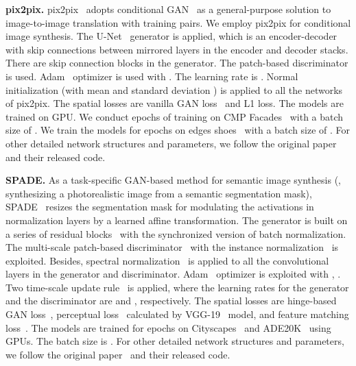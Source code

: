 \documentclass[10pt,twocolumn,letterpaper]{article}
\begin{document}
\vspace{0.1cm}
\noindent
\textbf{pix2pix.}
pix2pix~\cite{pix2pix} adopts conditional GAN~\cite{congan} as a general-purpose solution to image-to-image translation with training pairs.
We employ pix2pix for conditional image synthesis.
The U-Net~\cite{unet} generator is applied, which is an encoder-decoder with skip connections between mirrored layers in the encoder and decoder stacks. There are  skip connection blocks in the generator.
The patch-based discriminator is used.
Adam~\cite{adam} optimizer is used with . The learning rate is . Normal initialization (with mean  and standard deviation ) is applied to all the networks of pix2pix.
The spatial losses are vanilla GAN loss~\cite{GAN} and L1 loss.
The models are trained on  GPU.
We conduct  epochs of training on CMP Facades~\cite{cmpfacades} with a batch size of . We train the models for  epochs on edges  shoes~\cite{shoesutzappos50K} with a batch size of .
For other detailed network structures and parameters, we follow the original paper~\cite{pix2pix} and their released code.


\vspace{0.1cm}
\noindent
\textbf{SPADE.}
As a task-specific GAN-based method for semantic image synthesis (\ie, synthesizing a photorealistic image from a semantic segmentation mask), SPADE~\cite{SPADE} resizes the segmentation mask for modulating the activations in normalization layers by a learned affine transformation.
The generator is built on a series of residual blocks~\cite{resnet} with the synchronized version of batch normalization. The multi-scale patch-based discriminator~\cite{pix2pixhd} with the instance normalization~\cite{IN} is exploited. Besides, spectral normalization~\cite{spectralnorm} is applied to all the convolutional layers in the generator and discriminator.
Adam~\cite{adam} optimizer is exploited with , . Two time-scale update rule~\cite{TTUR} is applied, where the learning rates for the generator and the discriminator are  and , respectively.
The spatial losses are hinge-based GAN loss~\cite{geometricgan,spectralnorm,selfattentiongan}, perceptual loss~\cite{perceptualloss} calculated by VGG-19~\cite{vgg} model, and feature matching loss~\cite{pix2pixhd}.
The models are trained for  epochs on Cityscapes~\cite{cityscapes} and ADE20K~\cite{ade20k} using  GPUs. The batch size is .
For other detailed network structures and parameters, we follow the original paper~\cite{SPADE} and their released code.
\end{document}
